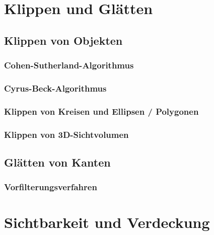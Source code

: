 \chapter{Klippen und Glätten}
\section{Klippen von Objekten}
\subsection{Cohen-Sutherland-Algorithmus}

\subsection{Cyrus-Beck-Algorithmus}

\subsection{Klippen von Kreisen und Ellipsen / Polygonen}

\subsection{Klippen von 3D-Sichtvolumen}

\section{Glätten von Kanten}
\subsection{Vorfilterungsverfahren}
\chapter{Sichtbarkeit und Verdeckung}
